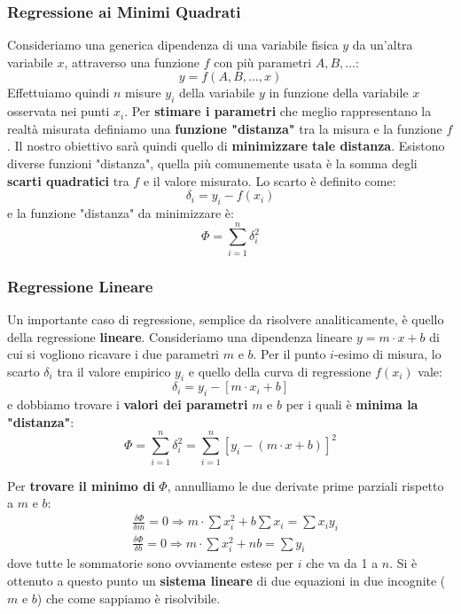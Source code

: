 \documentclass[a4paper,11pt]{report}
\begin{document}
\subsubsection{Regressione ai Minimi Quadrati}
Consideriamo una generica dipendenza di una variabile fisica $y$ da un'altra variabile $x$, attraverso una funzione $f$ con più parametri $A,B,\ldots$:
$$
  y = f(A,B,\ldots,x)
$$
Effettuiamo quindi $n$ misure $y_i$ della variabile $y$ in funzione della variabile $x$ osservata nei punti $x_i$. Per \textbf{stimare i parametri} che meglio rappresentano la realtà misurata definiamo una \textbf{funzione "distanza"} tra la misura e la funzione $f$. Il nostro obiettivo sarà quindi quello di \textbf{minimizzare tale distanza}. Esistono diverse funzioni "distanza", quella più comunemente usata è la somma degli \textbf{scarti quadratici} tra $f$ e il valore misurato.
Lo scarto è definito come:
\begin{equation}
  \label{regressione:scarto quadratico}  
    \delta_i = y_i - f(x_i)
\end{equation}
e la funzione "distanza" da minimizzare è:
\begin{equation}
  \label{regressione:funzione quadratica}  
    \Phi = \sum^n_{i=1}\delta_i^2
\end{equation}

\subsubsection{Regressione Lineare}
Un importante caso di regressione, semplice da risolvere analiticamente, è quello della regressione \textbf{lineare}. Consideriamo una dipendenza lineare $y = m\cdot x+b$ di cui si vogliono ricavare i due parametri $m$ e $b$. Per il punto $i$-esimo di misura, lo scarto $\delta_i$ tra il valore empirico $y_i$ e quello della curva di regressione $f(x_i)$ vale:
\begin{equation}
  \label{regressione:scarto lineare} 
  \delta_i = y_i - [m\cdot x_i + b]
\end{equation}
e dobbiamo trovare i \textbf{valori dei parametri} $m$ e $b$ per i quali è \textbf{minima la "distanza"}:
\begin{equation}
  \label{regressione:funzione lineare}  
    \Phi = \sum^n_{i=1}\delta_i^2 = \sum^n_{i=1}[y_i - (m\cdot x+b)]^2
\end{equation}

Per \textbf{trovare il minimo di} $\Phi$, annulliamo le due derivate prime parziali rispetto a $m$ e $b$:
\begin{align*}
  &\frac{\delta \Phi}{\delta m} = 0 \Rightarrow  m\cdot \sum x_i^2 + b \sum x_i = \sum x_i y_i \\
  &\frac{\delta \Phi}{\delta b} = 0 \Rightarrow  m\cdot \sum x_i^2 + nb= \sum y_i
\end{align*}
dove tutte le sommatorie sono ovviamente estese per $i$ che va da 1 a $n$. Si è ottenuto a questo punto un \textbf{sistema lineare} di due equazioni in due incognite ($m$ e $b$) che come sappiamo è risolvibile.
\end{document}
